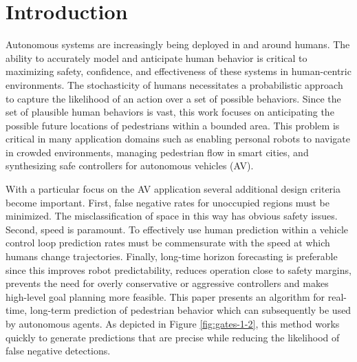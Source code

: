 \documentclass[letterpaper,10pt,conference]{ieeeconf}
\begin{document}

\section{Introduction}

Autonomous systems are increasingly being deployed in and around humans. 
The ability to accurately model and anticipate human behavior is critical to maximizing safety, confidence, and effectiveness of these systems in human-centric environments. 
The stochasticity of humans necessitates a probabilistic approach to capture the likelihood of an action over a set of possible behaviors. 
Since the set of plausible human behaviors is vast, this work focuses on anticipating the possible future locations of pedestrians within a bounded area. 
This problem is critical in many application domains such as enabling personal robots to navigate in crowded environments, managing pedestrian flow in smart cities, and synthesizing safe controllers for autonomous vehicles (AV).  

With a particular focus on the AV application several additional design criteria become important. 
First, false negative rates for unoccupied regions must be minimized.
The misclassification of space in this way has obvious safety issues.
Second, speed is paramount.
To effectively use human prediction within a vehicle control loop prediction rates must be commensurate with the speed at which humans change trajectories.
Finally, long-time horizon forecasting is preferable since this improves robot predictability, reduces operation close to safety margins, prevents the need for overly conservative or aggressive controllers and makes high-level goal planning more feasible.
This paper presents an algorithm for real-time, long-term prediction of pedestrian behavior which can subsequently be used by autonomous agents.
As depicted in Figure \ref{fig:gates-1-2}, this method works quickly to generate predictions that are precise while reducing the likelihood of false negative detections.
\end{document}
